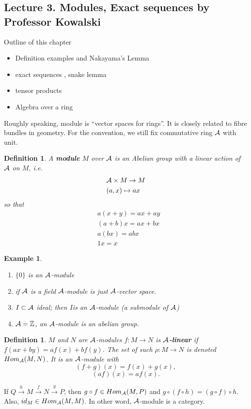 \documentclass[11pt]{article}
\newtheorem{dfn}[thm]{Definition}
\newtheorem{ex}[thm]{Example}
\newcommand{\intg}{\mathbb Z}
\newcommand{\cala}{{\cal A}}
\newcommand{\lrta}{\longrightarrow}
\begin{document}
\subsection{Lecture 3. Modules, Exact sequences by Professor Kowalski}
Outline of this chapter 
\begin{itemize}
\item Definition examples and Nakayama's Lemma
\item exact sequences , snake lemma
\item tensor products
\item Algebra over a ring
\end{itemize}
Roughly speaking, module is ``vector spaces for rings''. It is closely related to fibre bundles in geometry. For the convention, we still fix commutative ring $\cala$ with unit.
\begin{dfn}
A \textbf{module} $M$ over $\cala$ is an Abelian group with a linear action of $\cala$ on $M$, i.e.
$$
\begin{aligned}
& \cala\times M\rightarrow M\\
& (a,x)\mapsto ax
\end{aligned}
$$
so that 
$$
\begin{aligned}
&a(x+y)=ax+ay\\
&(a+b)x=ax+bx\\
&a(bx)=ab x\\
& 1 x= x
\end{aligned}
$$
\end{dfn}

\begin{ex}
\begin{enumerate}
\item $\{0\}$ is an $\cala$-module
\item if $\cala$ is a field $\cala$-module is just $\cala$-vector space.
\item $I\subset\cala$ ideal; then $I$is an $\cala$-module (a submodule of $\cala$)
\item $\cala=\intg$, an $\cala$-module is an abelian group.
\end{enumerate}
\end{ex}

\begin{dfn}
$M$ and $N$ are $\cala$-modules $f:M\rightarrow N$ is  \textbf{$\cala$-linear} if $f(ax+by)=af(x)+bf(y)$. The set of such $\rho:M\rightarrow N$ is denoted $Hom_{\cala}(M,N)$. It is an $\cala$-module with
$$
(f+g)(x)=f(x)+g(x),
$$
$$
(af)(x)=af(x).
$$
\end{dfn}
If
$Q\overset{h}{\lrta }M\overset{f}{\lrta} N\overset{g}{\lrta} P$, then $g\circ f\in Hom_\cala(M,P)$ and $g\circ(f\circ h)=(g\circ f)\circ h$. Also, $id_M\in Hom_\cala(M,M)$. In other word, $\cala$-module is a category.
\end{document}
